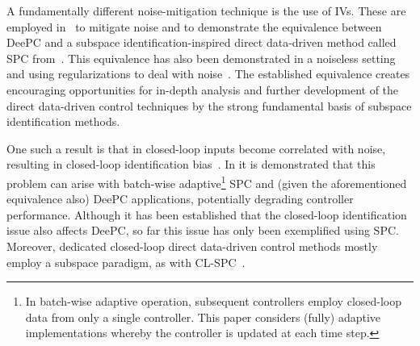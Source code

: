 A fundamentally different noise-mitigation technique is the use of \acf{IVs}. These are employed in~\cite{vanWingerden2022} to mitigate noise and to demonstrate the equivalence between \ac{DeePC} and a subspace identification-inspired direct data-driven method called \ac{SPC} from~\cite{Favoreel1999}. This equivalence has also been demonstrated in a noiseless setting and using regularizations to deal with noise~\citep{Fiedler2021}. The established equivalence creates encouraging opportunities for in-depth analysis and further development of the direct data-driven control techniques by the strong fundamental basis of subspace identification methods. %

One such a result is that in closed-loop inputs become correlated with noise, resulting in closed-loop identification bias~\citep{Soderstrom1989a}. In \cite{Dinkla2023} it is demonstrated that this problem can arise with batch-wise adaptive\footnote{In batch-wise adaptive operation, subsequent controllers employ closed-loop data from only a single controller. This paper considers (fully) adaptive implementations whereby the controller is updated at each time step.} \ac{SPC} and (given the aforementioned equivalence also) \ac{DeePC} applications, potentially degrading controller performance. Although it has been established that the closed-loop identification issue also affects \ac{DeePC}, so far this issue has only been exemplified using \ac{SPC}. Moreover, dedicated closed-loop direct data-driven control methods mostly employ a subspace paradigm, as with \acf{CL-SPC}~\citep{Dong2008}.

